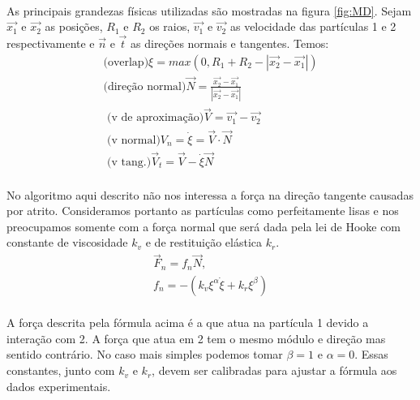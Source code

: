 \documentclass[a4paper,11pt]{article}
\begin{document}
  \paragraph{}As principais grandezas físicas utilizadas
  são mostradas na figura \ref{fig:MD}.
  Sejam $\vec{x_1}$ e $\vec{x_2}$ as posições,
  $R_1$ e $R_2$ os raios,  $\vec{v_1}$ e $\vec{v_2}$
  as velocidade  das
  partículas 1 e 2 respectivamente e $\vec{n}$ e
  $\vec{t}$ as direções normais e tangentes. Temos:
  \begin{equation}
    \begin{array}{l}
      \mbox{(overlap)}
              \xi
              = max(0, R_1 + R_2 - |\vec{x_2} - \vec{x_1} |)
\\%
\mbox{(direção normal)}
          \vec{N} = \frac{\vec{x_2} -
          \vec{x_1} }{|\vec{x_2} - \vec{x_1} |}
\\ %
\mbox{ (v de aproximação)}\vec{V} = \vec{v_1} - \vec{v_2}
\\%
\mbox{ (v normal)}  V_n = \dot{\xi} = \vec{V} \cdot \vec{N} 
\\%
\mbox{ (v tang.)}  \vec{V}_t = \vec{V} - \dot{\xi}\vec{N} 
	\end{array}
    \label{eq:DM-1}
  \end{equation}

  \paragraph{}No algoritmo aqui descrito não nos interessa
  a força na direção tangente causadas por atrito.
  Consideramos portanto as partículas como perfeitamente
  lisas e nos preocupamos
  somente com  a força normal que será dada pela lei de
  Hooke com constante de viscosidade $k_v$ e de restituição
  elástica $k_r$.
    \begin{equation}
		\begin{array}{l}
		    \vec{F}_n = f_n \vec{N}, \\
	    	f_n = -(k_v \xi^\alpha \dot{\xi} + k_r \xi^\beta)
		\end{array}
        \label{eq:DM-2}
    \end{equation}

    \paragraph{}A força descrita pela fórmula acima é a que
    atua na partícula 1 devido a interação com 2. A força
    que atua em 2 tem o mesmo módulo e direção mas sentido
    contrário. No caso mais simples podemos tomar $\beta =
    1$ e $\alpha = 0$. Essas constantes, junto com
    $k_v$ e $k_r$, devem ser
    calibradas para ajustar a fórmula aos dados
    experimentais.
\end{document}
